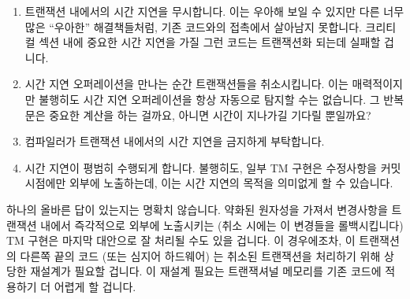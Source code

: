 \begin{enumerate}
\item	트랜잭션 내에서의 시간 지연을 무시합니다.
	이는 우아해 보일 수 있지만 다른 너무 많은 ``우아한'' 해결책들처럼, 기존
	코드와의 접촉에서 살아남지 못합니다.
	크리티컬 섹션 내에 중요한 시간 지연을 가질 그런 코드는 트랜잭션화
	되는데 실패할 겁니다.
\item	시간 지연 오퍼레이션을 만나는 순간 트랜잭션들을 취소시킵니다.
	이는 매력적이지만 불행히도 시간 지연 오퍼레이션을 항상 자동으로 탐지할
	수는 없습니다.
	그 반복문은 중요한 계산을 하는 걸까요, 아니면 시간이 지나가길 기다릴
	뿐일까요?
\item	컴파일러가 트랜잭션 내에서의 시간 지연을 금지하게 부탁합니다.
\item	시간 지연이 평범히 수행되게 합니다.
	불행히도, 일부 TM 구현은 수정사항을 커밋 시점에만 외부에 노출하는데,
	이는 시간 지연의 목적을 의미없게 할 수 있습니다.

\end{enumerate}

하나의 올바른 답이 있는지는 명확치 않습니다.
약화된 원자성을 가져서 변경사항을 트랜잭션 내에서 즉각적으로 외부에 노출시키는
(취소 시에는 이 변경들을 롤백시킵니다) TM 구현은 마지막 대안으로 잘 처리될 수도
있을 겁니다.
이 경우에조차, 이 트랜잭션의 다른쪽 끝의 코드 (또는 심지어 하드웨어) 는 취소된
트랜잭션을 처리하기 위해 상당한 재설계가 필요할 겁니다.
이 재설계 필요는 트랜잭셔널 메모리를 기존 코드에 적용하기 더 어렵게 할 겁니다.

